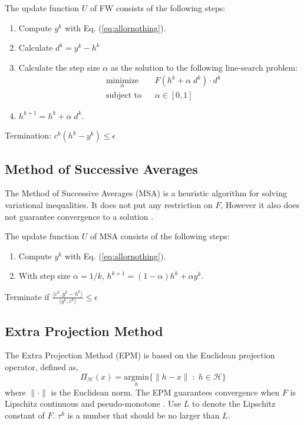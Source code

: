 The update function $U$ of FW consists of the following steps:
\begin{enumerate}
\item Compute $y^k$ with Eq. (\ref{eq:allornothing}).
\item Calculate $d^k = y^k - h^k$
\item Calculate the step size $\alpha$ as the solution to the following line-search problem:
\begin{equation}
\begin{aligned}
& \underset{\alpha}{\text{minimize}}
& & F(h^k + \alpha\; d^k)\cdot d^k \\
& \text{subject to}
& & \alpha \in [0,1]
\end{aligned}
\end{equation}
\item $h^{k+1} = h^k +\alpha\; d^k$.
\end{enumerate}

Termination: $c^k(h^k-y^k) \leq \epsilon$

\subsection{Method of Successive Averages}
The Method of Successive Averages (MSA) is a heuristic algorithm for solving variational inequalities. It does not put any restriction on $F$, However it also does not guarantee convergence to a solution  \cite{nie2010solving}.

The update function $U$ of MSA consists of the following steps:
\begin{enumerate}
\item Compute $y^k$ with Eq. (\ref{eq:allornothing}).
\item With step size $\alpha = 1/k$,  $h^{k+1} = (1-\alpha)h^k + \alpha y^k$. 
\end{enumerate}

Terminate if ${\frac {\langle c^k,y^k-h^k \rangle} {\langle y^k, c^k\rangle}} \leq \epsilon$

\subsection{Extra Projection Method}
The Extra Projection Method (EPM) is based on the Euclidean projection operator, defined as,
\begin{equation}
\Pi_\mathcal{H}(x) = \underset{h}{\text{argmin}}\{\lVert h-x\rVert \; : \;h \in\mathcal{H} \}
\end{equation}
where $\lVert\cdot\rVert$ is the Euclidean norm. The EPM guarantees convergence when $F$ is Lipschitz continuous and pseudo-monotone \cite{nie2010solving}. Use $L$ to denote the Lipschitz constant of $F$. $\tau^k$ is a number that should be no larger than $L$.

